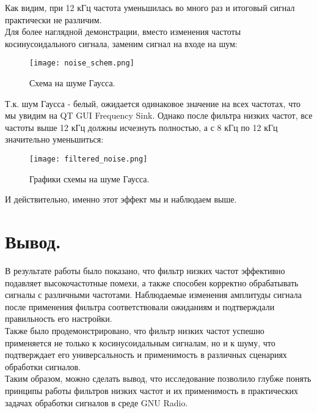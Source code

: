 \documentclass[a4paper,12pt]{extarticle}
\begin{document}
Как видим, при 12 кГц частота уменьшилась во много раз и итоговый сигнал 
практически не различим.\\
Для более наглядной демонстрации, вместо изменения частоты косинусоидального сигнала, 
заменим сигнал на входе на шум:
\begin{figure}[H]
    \centering
    \texttt{[image: noise\_schem.png]}
    \caption{Схема на шуме Гаусса.} %
    \label{fig:noise_schem} %
\end{figure}
Т.к. шум Гаусса - белый, ожидается одинаковое значение на всех частотах, что мы увидим 
на QT GUI Frequency Sink. Однако после фильтра низких частот, все частоты выше 12 кГц 
должны исчезнуть полностью, а с 8 кГц по 12 кГц значительно уменьшиться:
\begin{figure}[H]
    \centering
    \texttt{[image: filtered\_noise.png]}
    \caption{Графики схемы на шуме Гаусса.} %
    \label{fig:filtered_noise} %
\end{figure}
И действительно, именно этот эффект мы и наблюдаем выше.
\section{Вывод.}
В результате работы было показано, что фильтр низких частот эффективно 
подавляет высокочастотные помехи, а также способен корректно обрабатывать 
сигналы с различными частотами. Наблюдаемые изменения амплитуды сигнала после 
применения фильтра соответствовали ожиданиям и подтверждали правильность его настройки.\\
Также было продемонстрировано, что фильтр низких частот успешно применяется не 
только к косинусоидальным сигналам, но и к шуму, что подтверждает его 
универсальность и применимость в различных сценариях обработки сигналов.\\
Таким образом, можно сделать вывод, что исследование позволило глубже 
понять принципы работы фильтров низких частот и их применимость в 
практических задачах обработки сигналов в среде GNU Radio.\\
\end{document}
